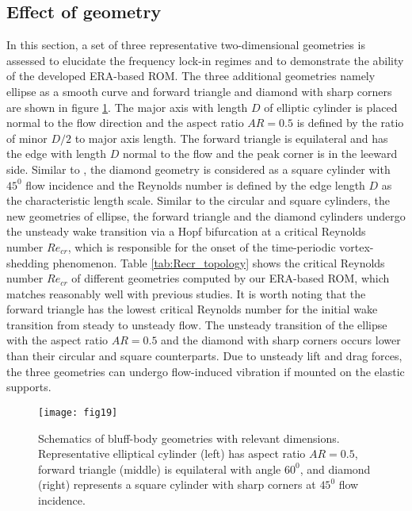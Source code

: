 \documentclass{jfm}
\begin{document}
\subsection{Effect of geometry}\label{sec:topology}

In this section, a set of three representative two-dimensional geometries is assessed to elucidate 
the frequency lock-in regimes and to demonstrate the ability of the developed ERA-based ROM. 
The three additional geometries namely ellipse as a smooth curve 
and forward triangle and diamond 
with sharp corners are shown in figure \ref{fig:topology}. 
The major axis with length $D$ of elliptic cylinder is placed normal to the flow direction and 
the aspect ratio $AR=0.5$ is defined by the ratio of minor $D/2$ to major axis length. 
The forward triangle is equilateral and 
has the edge with length $D$ normal to the flow and the peak corner is in the leeward side.
Similar to \cite{Zhao2013b}, 
the diamond geometry is considered as a square cylinder with $45^0$ flow incidence and 
the Reynolds number is defined by the edge length $D$ as the characteristic length scale.
%
Similar to the circular and square cylinders, the new geometries of ellipse, 
the forward triangle and the diamond cylinders 
undergo the unsteady wake transition via a Hopf bifurcation at a critical 
Reynolds number $Re_{cr}$, which is responsible for the onset of the time-periodic 
vortex-shedding phenomenon. 
%
Table \ref{tab:Recr_topology} shows 
the critical Reynolds number  $Re_{cr}$ 
of different geometries computed by our ERA-based ROM, 
which matches reasonably well with previous studies.
%
It is worth noting that the forward triangle has the lowest critical Reynolds number 
for the initial wake transition from steady to unsteady flow. 
%
The unsteady transition of the ellipse with the aspect ratio $AR=0.5$ and the diamond 
with sharp corners occurs lower than their circular and square counterparts.
%
Due to unsteady lift and drag forces, the three geometries can undergo 
flow-induced vibration if mounted on the elastic supports. 
\begin{figure}
\centering
    \texttt{[image: fig19]}
     \caption{Schematics of bluff-body geometries with relevant dimensions. 
     Representative elliptical cylinder (left) has aspect ratio $AR=0.5$, forward 
     triangle (middle) is equilateral with angle $60^0$, 
     and diamond (right) represents a square 
     cylinder with sharp corners at $45^0$ flow incidence.}
      \label{fig:topology}
\end{figure}
\end{document}
